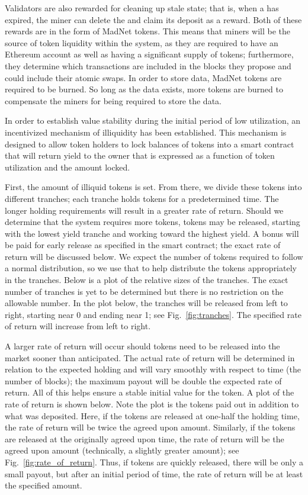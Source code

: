 Validators are also rewarded for cleaning up stale state;
that is, when a \DataStore{} has expired, the miner can delete the
\DataStore{} and claim its deposit as a reward.
Both of these rewards are in the form of MadNet tokens.
This means that miners will be the source of token liquidity
within the system, as they are required to have an Ethereum account
as well as having a significant supply of tokens;
furthermore, they determine which transactions are included
in the blocks they propose and could include their atomic swaps.
In order to store data, MadNet tokens are required to be burned.
So long as the data exists, more tokens are burned to compensate
the miners for being required to store the data.

In order to establish value stability during the initial period of low
utilization, an incentivized mechanism of illiquidity has been
established.
This mechanism is designed to allow token holders to lock balances of
tokens into a smart contract that will return yield to the owner that
is expressed as a function of token utilization and the amount locked.

First, the amount of illiquid tokens is set.
From there, we divide these tokens into different tranches; each
tranche holds tokens for a predetermined time.
The longer holding requirements will result in a greater rate of return.
Should we determine that the system requires more tokens, tokens may be
released, starting with the lowest yield tranche and working toward the
highest yield.
A bonus will be paid for early release as specified in the smart
contract; the exact rate of return will be discussed below.
We expect the number of tokens required to follow a normal
distribution, so we use that to help distribute the tokens
appropriately in the tranches.
Below is a plot of the relative sizes of the tranches.
The exact number of tranches is yet to be determined but there is no
restriction on the allowable number.
In the plot below, the tranches will be released from left to right,
starting near 0 and ending near 1; see Fig.~\ref{fig:tranches}.
The specified rate of return will increase from left to right.



A larger rate of return will occur should tokens need to be released
into the market sooner than anticipated.
The actual rate of return will be determined in relation to the
expected holding and will vary smoothly with respect to time (the
number of blocks); the maximum payout will be double the expected rate
of return.
All of this helps ensure a stable initial value for the token.
A plot of the rate of return is shown below.
Note the plot is the tokens paid out in addition to what was deposited.
Here, if the tokens are released at one-half the holding time, the rate
of return will be twice the agreed upon amount.
Similarly, if the tokens are released at the originally agreed upon
time, the rate of return will be the agreed upon amount (technically, a
slightly greater amount); see Fig.~\ref{fig:rate_of_return}.
Thus, if tokens are quickly released, there will be only a small
payout, but after an initial period of time, the rate of return will be
at least the specified amount.


